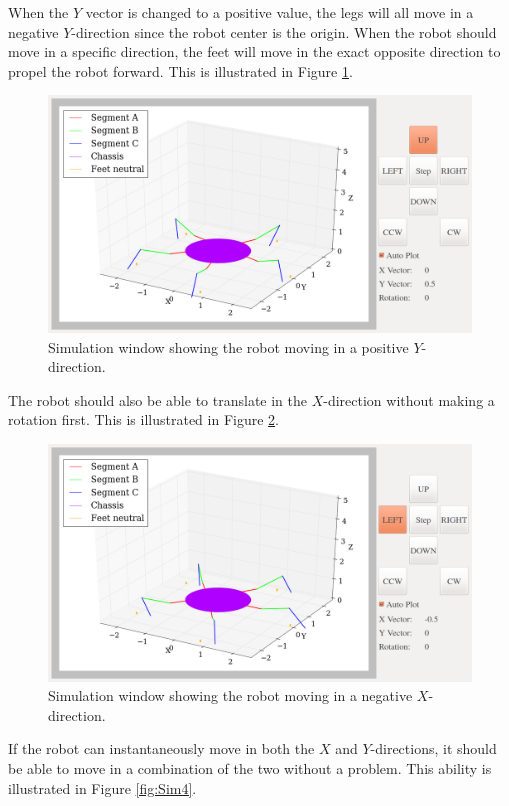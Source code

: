 When the $Y$ vector is changed to a positive value, the legs will all move in a negative $Y$-direction since the robot center is the origin. When the robot should move in a specific direction, the feet will move in the exact opposite direction to propel the robot forward. This is illustrated in Figure \ref{fig:Sim2}.

\begin{figure}[H]
\centering
\includegraphics[scale = 0.33]{pics/Sim2.png}
\caption{Simulation window showing the robot moving in a positive $Y$-direction.}
\label{fig:Sim2}
\end{figure}

The robot should also be able to translate in the $X$-direction without making a rotation first. This is illustrated in Figure \ref{fig:Sim3}.

\begin{figure}[H]
\centering
\includegraphics[scale = 0.33]{pics/Sim3.png}
\caption{Simulation window showing the robot moving in a negative $X$-direction.}
\label{fig:Sim3}
\end{figure}

If the robot can instantaneously move in both the $X$ and $Y$-directions, it should be able to move in a combination of the two without a problem. This ability is illustrated in Figure \ref{fig:Sim4}.

